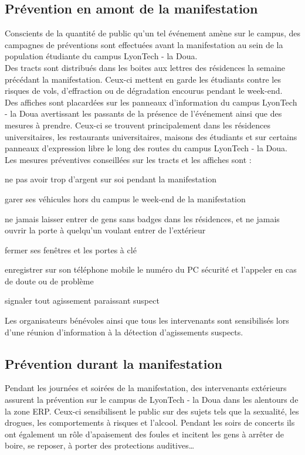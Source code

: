 \documentclass[hidelinks, paper=a4, fontsize=13pt]{report}
\begin{document}
\subsection{Prévention en amont de la manifestation}
Conscients de la quantité de public qu’un tel événement amène sur le campus, des campagnes de préventions sont effectuées avant la manifestation au sein de la population étudiante du campus LyonTech - la Doua.\\

Des tracts sont distribués dans les boites aux lettres des résidences la semaine précédant la manifestation. Ceux-ci mettent en garde les étudiants contre les risques de vols, d’effraction ou de dégradation encourus pendant le week-end.\\

Des affiches sont placardées sur les panneaux d’information du campus LyonTech - la Doua avertissant les passants de la présence de l’événement ainsi que des mesures à prendre. Ceux-ci se trouvent principalement dans les résidences universitaires, les restaurants universitaires, maisons des étudiants et sur certains panneaux d’expression libre le long des routes du campus LyonTech - la Doua.\\

Les mesures préventives conseillées sur les tracts et les affiches sont :
\begin{list}{•}{}
\item ne pas avoir trop d’argent sur soi pendant la manifestation
\item garer ses véhicules hors du campus le week-end de la manifestation
\item ne jamais laisser entrer de gens sans badges dans les résidences, et ne jamais ouvrir la porte à quelqu’un voulant entrer de l’extérieur
\item fermer ses fenêtres et les portes à clé
\item enregistrer sur son téléphone mobile le numéro du PC sécurité et l’appeler en cas de doute ou de problème
\item signaler tout agissement paraissant suspect
\end{list}
Les organisateurs bénévoles ainsi que tous les intervenants sont sensibilisés lors d’une réunion d’information à la détection d’agissements suspects.
\subsection{Prévention durant la manifestation}
Pendant les journées et soirées de la manifestation, des intervenants extérieurs assurent la prévention sur le campus de LyonTech - la Doua dans les alentours de la zone ERP. Ceux-ci sensibilisent le public sur des sujets tels que la sexualité, les drogues, les comportements à risques et l’alcool.
Pendant les soirs de concerts ils ont également un rôle d’apaisement des foules et incitent les gens à arrêter de boire, se reposer, à porter des protections auditives…\\
\end{document}
